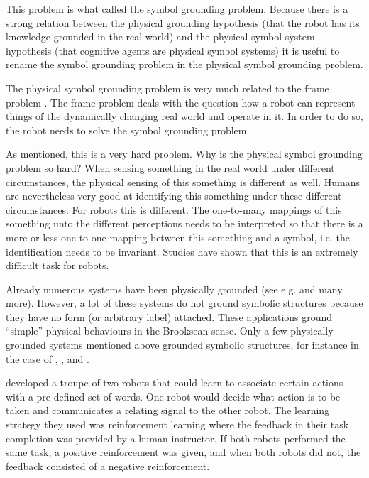 This problem is what \citet{harnad:1990} called the symbol grounding problem. Because there is a strong relation between the physical grounding hypothesis (that the robot has its knowledge grounded in the real world) and the physical symbol system hypothesis (that cognitive agents are physical symbol systems) it is useful to rename the symbol grounding problem in the {\sc physical symbol grounding problem}.

The physical symbol grounding problem is very much related to the {\sc frame problem} \citep{pylyshyn:1987}. The frame problem deals with the question how a robot can represent things of the dynamically changing real world and operate in it. In order to do so, the robot needs to solve the symbol grounding problem. 


As mentioned, this is a very hard problem. Why is the physical symbol grounding problem so hard? When sensing something in the real world under different circumstances, the physical sensing of this something is different as well. Humans are nevertheless very good at identifying this something under these different circumstances. For robots this is different. The one-to-many mappings of this something unto the different perceptions needs to be interpreted so that there is a more or less one-to-one mapping between this something and a symbol, i.e. the identification needs to be invariant. Studies have shown that this is an extremely difficult task for robots.

Already numerous systems have been physically grounded (see e.g. \citealt{brooks:1990,steels:1994,barnesetal:1997,KroBunVlaMot99,taninolfi:1998,berthouzekuniyoshi:1998,pfeiferscheier:1999,billard:1997a,rosenstein:1998a,yancostein} and many more). However, a lot of these systems do not ground symbolic structures because they have no form (or arbitrary label) attached. These applications ground ``simple'' physical behaviours in the Brooksean sense. Only a few physically grounded systems mentioned above grounded symbolic structures, for instance in the case of \citet{yancostein}, \citet{billard:1997a}, and \citet{rosenstein:1998a}. 


\citeauthor{yancostein} developed a troupe of two robots that could learn to associate certain actions with a pre-defined set of words. One robot would decide what action is to be taken and communicates a relating signal to the other robot. The learning strategy they used was reinforcement learning where the feedback in their task completion was provided by a human instructor. If both robots performed the same task, a positive reinforcement was given, and when both robots did not, the feedback consisted of a negative reinforcement.

